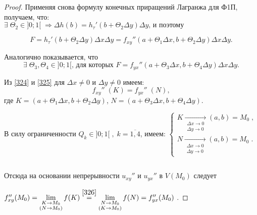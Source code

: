 \begin{proof}
    Применяя снова формулу конечных приращений Лагранжа для Ф1П, получаем, что:\\
    $   
        \exists \; \Theta_2 \in ]0;1[ \; \Rightarrow \Delta h(b) = 
        h_{\tau}' (b + \Theta_2 \Delta y) \Delta y
        \text{, и поэтому } 
    $
    
    \begin{equation}
        \label{324}        
        F = h_{\tau}' (b + \Theta_2 \Delta y) \Delta x \Delta y =
        f_{xy}''(a + \Theta_1 \Delta x, b + \Theta_2 \Delta y)
        \Delta x \Delta y.
    \end{equation}
    
    Аналогично показывается, что 
    \begin{equation}
        \label{325}       
        \exists \; \Theta_3, \Theta_4 \in ]0; 1[ 
        \text{, для которых }
        F = f_{yx}'' ( a + \Theta_3 \Delta x, b + \Theta_4 \Delta y)
        \Delta x \Delta y.        
    \end{equation}
    
    Из \eqref{324} и \eqref{325} для $ \Delta x \neq 0 $ и $ \Delta y \neq 0 $ имеем:
    \begin{equation}
        \label{326}
        f_{xy}'' \; (K) = f_{yx}'' \; (N), 
    \end{equation}
    где $ K = (a + \Theta_1 \Delta x, b + \Theta_2 \Delta y) $,
    $  N = (a + \Theta_3 \Delta x, b + \Theta_4 \Delta y) $.
    
    В силу ограниченности $ Q_k \in ]0;1[ \; , \; k = \overline{1, 4}$, 
    имеем:
    $ 
        \begin{cases}
            K \underset{ 
                \substack{
                        \Delta x \to 0 \\ \Delta y \to 0
                    }
                }{\xrightarrow{\;\;\;\;\;\;\;}}
            (a, b) = M_0 \; ,
            \\
            N \underset{ 
                \substack{
                    \Delta x \to 0 \\ \Delta y \to 0
                   }
               }{\xrightarrow{\;\;\;\;\;\;\;}}
           (a, b) = M_0 \; .
        \end{cases}
    $
    
    $  $\newline
    
    Отсюда на основании непрерывности 
    $ u_{xy}'' $ и $ u_{yx}'' $ в $ V(M_0) $  следует
    
    $ 
    f_{xy}'' (M_0) = \lim\limits_{ \substack{ K \to M_0 \\ (N \to M_0) } } f(K)
    \overset{\eqref{326}}{=} 
    \lim\limits_{ \substack{ N \to M_0 \\ (K \to M_0) } } f(N)
    = f_{yx} '' (M_0)$ .
\end{proof}

